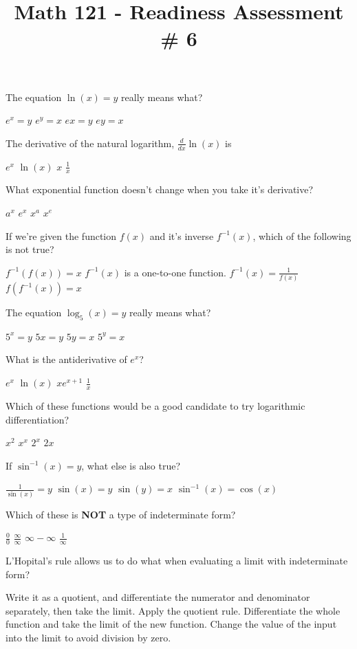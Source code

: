\documentclass{exam}
\title{Math 121 - Readiness Assessment \# 6}
\date{}
\begin{document}
\maketitle

\begin{questions}
\question The equation $\ln (x) = y$ really means what?
\begin{choices}
\choice $e^x = y$
\choice $e^y = x$
\choice $ex = y$
\choice $ey = x$
\end{choices}
\question The derivative of the natural logarithm, $\frac{d}{dx} \ln(x)$ is
\begin{choices}
\choice $e^x$
\choice $\ln(x)$
\choice $x$
\choice $\frac{1}{x}$
\end{choices}
\question What exponential function doesn't change when you take it's derivative?
\begin{choices}
\choice $a^x$
\choice $e^x$
\choice $x^a$
\choice $x^e$
\end{choices}
\question If we're given the function $f(x)$ and it's inverse $f^{-1}(x)$, which of the following is not true?
\begin{choices}
\choice $f^{-1}(f(x)) = x$
\choice $f^{-1}(x)$ is a one-to-one function.
\choice $f^{-1}(x) = \frac{1}{f(x)}$
\choice $f(f^{-1}(x)) = x$
\end{choices}
\question The equation $\log_{5} (x) = y$ really means what?
\begin{choices}
\choice $5^x = y$
\choice $5x = y$
\choice $5y = x$
\choice $5^y = x$
\end{choices}
\question What is the antiderivative of $e^x$?
\begin{choices}
\choice $e^x$
\choice $\ln(x)$
\choice $xe^{x+1}$
\choice $\frac{1}{x}$
\end{choices}
\newpage
\question Which of these functions would be a good candidate to try logarithmic differentiation?\\
\begin{choices}
\choice $x^2$
\choice $x^x$
\choice $2^x$
\choice $2x$
\end{choices}
\question If $\sin^{-1}(x) = y$, what else is also true?\\
\begin{choices} 
\choice $\frac{1}{\sin(x)} = y$
\choice $\sin(x) = y$
\choice $\sin(y) = x$
\choice $\sin^{-1}(x) = \cos(x)$
\end{choices} 
\question Which of these is \textbf{NOT} a type of indeterminate form?\\ 
\begin{oneparchoices}
\choice $\frac{0}{0}$
\choice $\frac{\infty}{\infty}$
\choice $\infty - \infty$
\choice $\frac{1}{\infty}$
\end{oneparchoices}
\question L'Hopital's rule allows us to do what when evaluating a limit with indeterminate form?
\begin{choices}
\choice Write it as a quotient, and differentiate the numerator and denominator separately, then take the limit.
\choice Apply the quotient rule.
\choice Differentiate the whole function and take the limit of the new function.
\choice Change the value of the input into the limit to avoid division by zero.
\end{choices}\end{questions}
\end{document}
